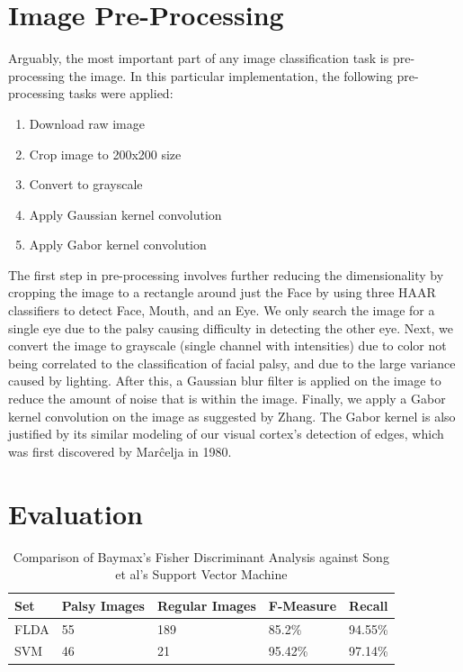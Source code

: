 \documentclass[12pt, conference]{IEEEtran}
\begin{document}
\section{Image Pre-Processing} 
Arguably, the most important part of any image classification task is pre-processing the image. In this particular implementation, the following pre-processing tasks were applied:
\begin{flushleft}
\begin{enumerate}
	\item Download raw image
	\item Crop image to 200x200 size
	\item Convert to grayscale
	\item Apply Gaussian kernel convolution
	\item Apply Gabor kernel convolution
\end{enumerate}	
\end{flushleft}
The first step in pre-processing involves further reducing the dimensionality by cropping the image to a rectangle around just the Face by using three HAAR classifiers to detect Face, Mouth, and an Eye. We only search the image for a single eye due to the palsy causing difficulty in detecting the other eye. Next, we convert the image to grayscale (single channel with intensities) due to color not being correlated to the classification of facial palsy, and due to the large variance caused by lighting. After this, a Gaussian blur filter is applied on the image to reduce the amount of noise that is within the image. Finally, we apply a Gabor kernel convolution on the image as suggested by Zhang\cite{4}. The Gabor kernel is also justified by its similar modeling of our visual cortex's detection of edges, which was first discovered by Marĉelja in 1980\cite{3}. 
\section{Evaluation} 
\begin{table}
\begin{center}
\caption{Comparison of Baymax's Fisher Discriminant Analysis against Song\cite{1} et al's Support Vector Machine} %
\centering %
\begin{tabular}{p{4.8cm} p{2cm}  p{2.3cm}  p{2cm}  p{2.4cm} } %
\hline\hline %
Set & Palsy Images & Regular Images & F-Measure & Recall \\ [0.5ex]
\hline %
FLDA & 55 & 189 & 85.2\% & 94.55\% \\ %
SVM & 46 & 21 & 95.42\% & 97.14\% \\ %
[1ex] %
\hline %
\end{tabular}
\label{table:metrics} %
\end{center}	
\end{table}
\end{document}
